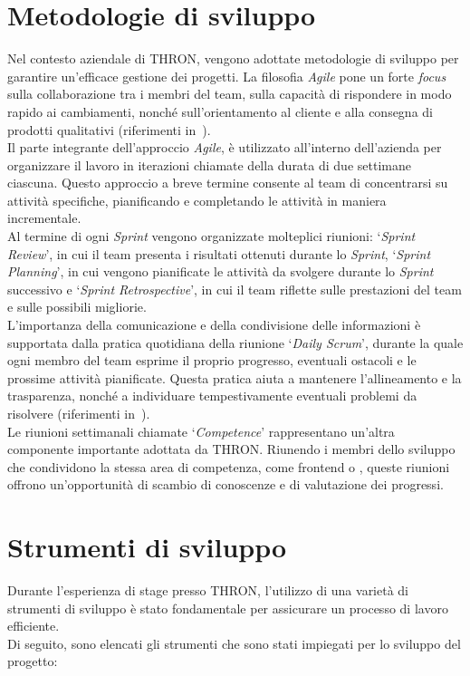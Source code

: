 \section{Metodologie di sviluppo}\label{sec:metodologie-sviluppo}
Nel contesto aziendale di THRON, vengono adottate metodologie di sviluppo  per garantire un'efficace
gestione dei progetti. La filosofia \textit{Agile} pone un forte \textit{focus} sulla collaborazione tra i membri del team,
sulla capacità di rispondere in modo rapido ai cambiamenti, nonché sull'orientamento al cliente e alla consegna di prodotti qualitativi (riferimenti in~\cite{site:agile-manifesto}).\\
Il   parte integrante dell'approccio \textit{Agile}, è utilizzato all'interno dell'azienda per organizzare il lavoro in iterazioni chiamate
 della durata di due settimane ciascuna. Questo approccio a breve termine consente al team di concentrarsi su attività specifiche, pianificando
e completando le attività in maniera incrementale.\\
Al termine di ogni \textit{Sprint} vengono organizzate molteplici riunioni: `\textit{Sprint Review}', in cui il team presenta i risultati ottenuti durante lo \textit{Sprint},
`\textit{Sprint Planning}', in cui vengono pianificate le attività da svolgere durante lo \textit{Sprint} successivo e `\textit{Sprint Retrospective}', in cui il team riflette sulle prestazioni del team e sulle possibili migliorie.\\
L'importanza della comunicazione e della condivisione delle informazioni è supportata dalla pratica quotidiana della riunione `\textit{Daily Scrum}', durante la quale
ogni membro del team esprime il proprio progresso, eventuali ostacoli e le prossime attività pianificate. Questa pratica aiuta a mantenere l'allineamento e
la trasparenza, nonché a individuare tempestivamente eventuali problemi da risolvere (riferimenti in~\cite{site:scrum}).\\
Le riunioni settimanali chiamate `\textit{Competence}' rappresentano un'altra componente importante adottata da THRON. Riunendo i membri dello sviluppo 
che condividono la stessa area di competenza, come frontend o , queste riunioni offrono un'opportunità di scambio di conoscenze e di valutazione dei progressi.
\section{Strumenti di sviluppo}\label{sec:strumenti-sviluppo}
Durante l'esperienza di stage presso THRON, l'utilizzo di una varietà di strumenti di sviluppo è stato fondamentale per assicurare un processo di lavoro efficiente.\\
Di seguito, sono elencati gli strumenti che sono stati impiegati per lo sviluppo del progetto:

